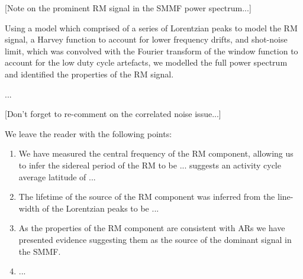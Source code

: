 [Note on the prominent RM signal in the SMMF power spectrum...]

Using a model which comprised of a series of Lorentzian peaks to model the RM signal, a Harvey function to account for lower frequency drifts, and shot-noise limit, which was convolved with the Fourier transform of the window function to account for the low duty cycle artefacts, we modelled the full power spectrum and identified the properties of the RM signal.

...

[Don't forget to re-comment on the correlated noise issue...]

We leave the reader with the following points:

\begin{enumerate}
	\item{We have measured the central frequency of the RM component, allowing us to infer the sidereal period of the RM to be ... suggests an activity cycle average latitude of ... }
	
	\item{The lifetime of the source of the RM component was inferred from the line-width of the Lorentzian peaks to be ...}
	
	\item{As the properties of the RM component are consistent with ARs we have presented evidence suggesting them as the source of the dominant signal in the SMMF.}
	
	\item{...}
\end{enumerate}


